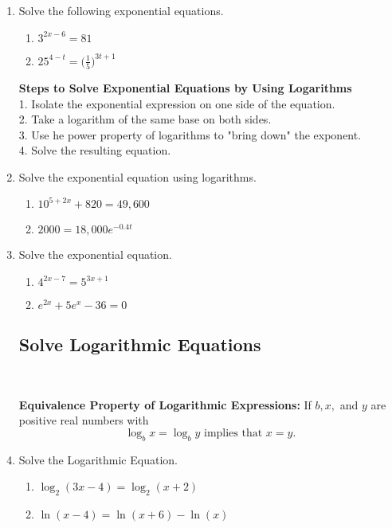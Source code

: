 \begin{enumerate}
\item Solve the following exponential equations.
\begin{enumerate}
\item $\displaystyle 3^{2x-6}=81$\vfill
\item $\displaystyle 25^{4-t}=\Bigg(\frac{1}{5}\Bigg)^{3t+1}$\vfill
\end{enumerate}

\newpage

\noindent \textbf{Steps to Solve Exponential Equations by Using Logarithms}\\
1. Isolate the exponential expression on one side of the equation.\\
2. Take a logarithm of the same base on both sides.\\
3. Use he power property of logarithms to "bring down" the exponent.\\
4. Solve the resulting equation.\\

\item Solve the exponential equation using logarithms.
\begin{enumerate}
\item $\displaystyle 10^{5+2x}+820=49,600$\vfill
\item $\displaystyle 2000=18,000e^{-0.4t}$\vfill
\end{enumerate}



\item Solve the exponential equation.
\begin{enumerate}
\item $\displaystyle 4^{2x-7}=5^{3x+1}$\vfill
\item $\displaystyle e^{2x}+5e^x-36=0$\vfill
\end{enumerate}

\newpage

\subsection{Solve Logarithmic Equations} ~

\noindent \textbf{Equivalence Property of Logarithmic Expressions:} If $b, x,$ and $y$ are positive real numbers with $$\log_b x = \log_b y \text{ implies that } x=y.$$   


\item Solve the Logarithmic Equation.
\begin{enumerate}
\item $\displaystyle \log_2(3x-4)=\log_2(x+2)$\vfill
\item $\displaystyle \ln(x-4)=\ln(x+6)-\ln(x)$\vfill
\vfill
\end{enumerate}


\end{enumerate}
